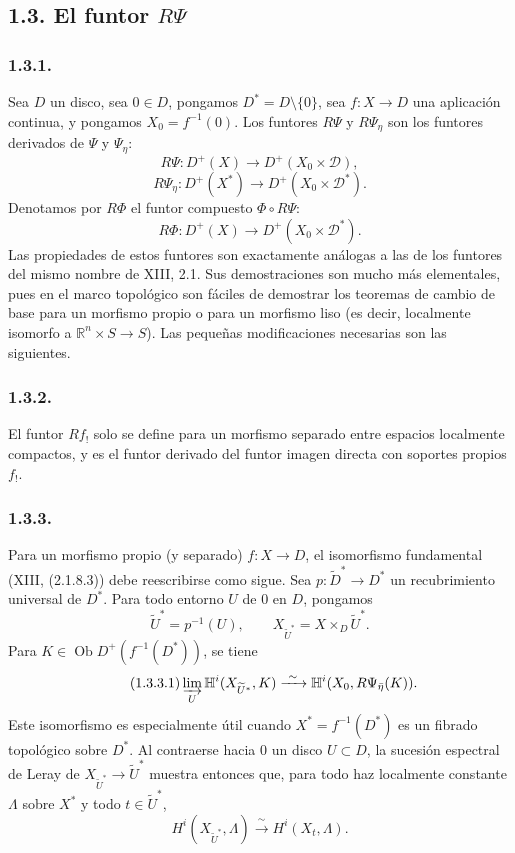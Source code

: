 \pageoriginale

\subsection*{\texorpdfstring{1.3. El funtor $R\Psi$}{1.3. El funtor R Psi}}

\subsubsection*{1.3.1.}
Sea $D$ un disco, sea $0\in D$, pongamos $D^*=D\setminus\{0\}$, sea
$f:X\longrightarrow D$ una aplicación continua, y pongamos
$X_0=f^{-1}(0)$. Los funtores $R\Psi$ y $R\Psi_\eta$ son los funtores
derivados de $\Psi$ y $\Psi_\eta$:
\[
R\Psi:D^+(X)\longrightarrow D^+(X_0\times\mathcal D),
\]
\[
R\Psi_\eta:D^+(X^*)\longrightarrow D^+(X_0\times\mathcal D^*).
\]
Denotamos por $R\Phi$ el funtor compuesto $\Phi\circ R\Psi$:
\[
R\Phi:D^+(X)\longrightarrow D^+(X_0\times\mathcal D^*).
\]
Las propiedades de estos funtores son exactamente análogas a las de los
funtores del mismo nombre de XIII, 2.1. Sus demostraciones son mucho más
elementales, pues en el marco topológico son fáciles de demostrar los teoremas
de cambio de base para un morfismo propio o para un morfismo liso (es decir,
localmente isomorfo a $\mathbb R^n\times S\longrightarrow S$). Las pequeñas
modificaciones necesarias son las siguientes.

\subsubsection*{1.3.2.}
El funtor $Rf_!$ solo se define para un morfismo separado entre espacios
localmente compactos, y es el funtor derivado del funtor imagen directa con
soportes propios $f_!$.

\subsubsection*{1.3.3.}
Para un morfismo propio (y separado) $f:X\longrightarrow D$, el isomorfismo
fundamental (XIII, (2.1.8.3)) debe reescribirse como sigue. Sea
$p:\widetilde D^*\longrightarrow D^*$ un recubrimiento universal de $D^*$.
Para todo entorno $U$ de $0$ en $D$, pongamos
\[
\widetilde U^*=p^{-1}(U),
\qquad
X_{\widetilde U^*}=X\times_D\widetilde U^*.
\]
Para $K\in\operatorname{Ob}D^+(f^{-1}(D^*))$, se tiene
\begin{equation}\tag{1.3.3.1}
\varinjlim_U\mathbb H^i(X_{\widetilde U^*},K)
\xrightarrow{\ \sim\ }
\mathbb H^i(X_0,R\Psi_{\bar\eta}(K)).
\end{equation}
Este isomorfismo es especialmente útil cuando $X^*=f^{-1}(D^*)$ es un fibrado
topológico sobre $D^*$. Al contraerse hacia $0$ un disco $U\subset D$, la
sucesión espectral de Leray de
$X_{\widetilde U^*}\longrightarrow\widetilde U^*$ muestra entonces que, para
todo haz localmente constante $\Lambda$ sobre $X^*$ y todo
$t\in\widetilde U^*$,
\[
H^i(X_{\widetilde U^*},\Lambda)
\xrightarrow{\ \sim\ }H^i(X_t,\Lambda).
\]

